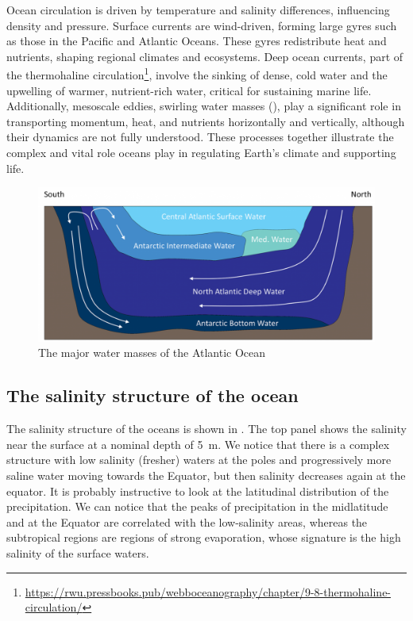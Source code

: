 Ocean circulation is driven by temperature and salinity differences, influencing density and pressure. Surface currents are wind-driven, forming large gyres such as those in the Pacific and Atlantic Oceans. These gyres redistribute heat and nutrients, shaping regional climates and ecosystems. Deep ocean currents, part of the thermohaline circulation\footnote{\url{https://rwu.pressbooks.pub/webboceanography/chapter/9-8-thermohaline-circulation/}}, involve the sinking of dense, cold water and the upwelling of warmer, nutrient-rich water, critical for sustaining marine life.
Additionally, mesoscale eddies, swirling water masses (\fig{\ref{fig:water-masses-atlantic}}), play a significant role in transporting momentum, heat, and nutrients horizontally and vertically, although their dynamics are not fully understood. These processes together illustrate the complex and vital role oceans play in regulating Earth's climate and supporting life.
\begin{figure}
	\centering
	\includegraphics[width=0.6\linewidth]{figs/water-masses-atlantic}
	\caption{The major water masses of the Atlantic Ocean}
	\label{fig:water-masses-atlantic}
\end{figure}

\subsection{The salinity structure of the ocean}\label{subsec:ocean-salinity-structure}
The salinity structure of the oceans is shown in \fig{\ref{fig:ocean-salinity}}.  The top panel shows the salinity near the surface at a nominal depth of \qty{5}{\meter}. We notice that there is a complex structure with low salinity
(fresher) waters at the poles and progressively more saline water moving towards the Equator, but then salinity decreases again at the equator. It is probably instructive to look at the latitudinal distribution of the precipitation. We can notice that the peaks of precipitation in the midlatitude and at the Equator are correlated with the low-salinity areas, whereas the subtropical regions are regions of strong evaporation, whose signature is the high salinity of the surface waters.

